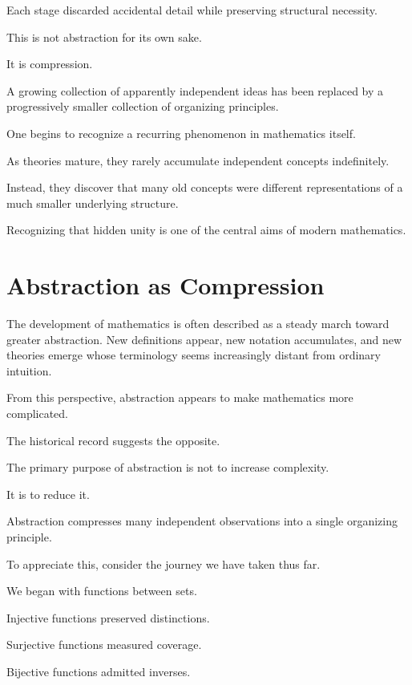 \documentclass[11pt]{book}
\numberwithin{equation}{chapter}
\theoremstyle{definition}
\theoremstyle{plain}
\theoremstyle{remark}
\begin{document}
Each stage discarded accidental detail while preserving structural necessity.

This is not abstraction for its own sake.

It is compression.

A growing collection of apparently independent ideas has been replaced by a progressively smaller collection of organizing principles.

One begins to recognize a recurring phenomenon in mathematics itself.

As theories mature, they rarely accumulate independent concepts indefinitely.

Instead, they discover that many old concepts were different representations of a much smaller underlying structure.

Recognizing that hidden unity is one of the central aims of modern mathematics.


\section{Abstraction as Compression}

The development of mathematics is often described as a steady march toward greater abstraction. New definitions appear, new notation accumulates, and new theories emerge whose terminology seems increasingly distant from ordinary intuition.

From this perspective, abstraction appears to make mathematics more complicated.

The historical record suggests the opposite.

The primary purpose of abstraction is not to increase complexity.

It is to reduce it.

Abstraction compresses many independent observations into a single organizing principle.

To appreciate this, consider the journey we have taken thus far.

We began with functions between sets.

Injective functions preserved distinctions.

Surjective functions measured coverage.

Bijective functions admitted inverses.
\end{document}
